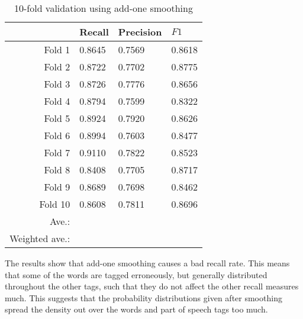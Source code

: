 \documentclass[12pt]{homework}
\begin{document}
\begin{table}
	\begin{center}
	\begin{tabular}{r | l l l}
		\hline
		&	Recall	&	Precision& $F1$ \\
		\hline
	Fold 1	 &	0.8645  &	0.7569	 &	0.8618\\
	Fold 2	 &	0.8722	&	0.7702	 &	0.8775\\
	Fold 3	 &	0.8726	&	0.7776	 &	0.8656\\
	Fold 4	 &	0.8794	&	0.7599	 &	0.8322\\
	Fold 5	 &	0.8924	&	0.7920	 &	0.8626\\
	Fold 6	 &	0.8994	&	0.7603	 &	0.8477\\
	Fold 7	 &	0.9110	&	0.7822	 &	0.8523\\
	Fold 8	 &	0.8408	&	0.7705	 &	0.8717\\
	Fold 9	 &	0.8689	&	0.7698	 &	0.8462\\
	Fold 10	 &	0.8608	&	0.7811	 &	0.8696\\
		\hline
		Ave.: &		&		&			\\
		Weighted ave.: &	&	&			\\
		\hline
	\end{tabular}
	\end{center}
	\caption{10-fold validation using add-one smoothing}
	\label{addoneresult}
\end{table}
The results show that add-one smoothing causes a bad recall rate. This means 
that some of the words are tagged erroneously, but generally distributed 
throughout the other tags, such that they do not affect the other recall 
measures much. This suggests that the probability distributions given after 
smoothing spread the density out over the words and part of speech tags too 
much.
\end{document}
